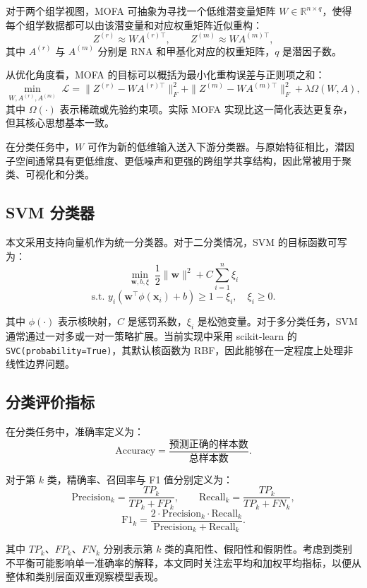对于两个组学视图，MOFA 可抽象为寻找一个低维潜变量矩阵 $W \in \mathbb{R}^{n \times q}$，使得每个组学数据都可以由该潜变量和对应权重矩阵近似重构：
\[
Z^{(r)} \approx W A^{(r)\top}, \qquad Z^{(m)} \approx W A^{(m)\top},
\]
其中 $A^{(r)}$ 与 $A^{(m)}$ 分别是 RNA 和甲基化对应的权重矩阵，$q$ 是潜因子数。

从优化角度看，MOFA 的目标可以概括为最小化重构误差与正则项之和：
\[
\min_{W, A^{(r)}, A^{(m)}} \; \mathcal{L} = \|Z^{(r)} - W A^{(r)\top}\|_F^2 + \|Z^{(m)} - W A^{(m)\top}\|_F^2 + \lambda \Omega(W, A),
\]
其中 $\Omega(\cdot)$ 表示稀疏或先验约束项。实际 MOFA 实现比这一简化表达更复杂，但其核心思想基本一致。

在分类任务中，$W$ 可作为新的低维输入送入下游分类器。与原始特征相比，潜因子空间通常具有更低维度、更低噪声和更强的跨组学共享结构，因此常被用于聚类、可视化和分类。

\subsection{SVM 分类器}

本文采用支持向量机作为统一分类器。对于二分类情况，SVM 的目标函数可写为：
\[
\min_{\mathbf{w}, b, \xi} \; \frac{1}{2}\|\mathbf{w}\|^2 + C \sum_{i=1}^{n} \xi_i
\]
\[
\text{s.t. } y_i (\mathbf{w}^\top \phi(\mathbf{x}_i) + b) \ge 1 - \xi_i, \quad \xi_i \ge 0.
\]

其中 $\phi(\cdot)$ 表示核映射，$C$ 是惩罚系数，$\xi_i$ 是松弛变量。对于多分类任务，SVM 通常通过一对多或一对一策略扩展。当前实现中采用 scikit-learn 的 \texttt{SVC(probability=True)}，其默认核函数为 RBF，因此能够在一定程度上处理非线性边界问题。

\subsection{分类评价指标}

在分类任务中，准确率定义为：
\[
\mathrm{Accuracy} = \frac{\text{预测正确的样本数}}{\text{总样本数}}.
\]

对于第 $k$ 类，精确率、召回率与 F1 值分别定义为：
\[
\mathrm{Precision}_k = \frac{TP_k}{TP_k + FP_k}, \qquad
\mathrm{Recall}_k = \frac{TP_k}{TP_k + FN_k},
\]
\[
\mathrm{F1}_k = \frac{2 \cdot \mathrm{Precision}_k \cdot \mathrm{Recall}_k}{\mathrm{Precision}_k + \mathrm{Recall}_k}.
\]

其中 $TP_k$、$FP_k$、$FN_k$ 分别表示第 $k$ 类的真阳性、假阳性和假阴性。考虑到类别不平衡可能影响单一准确率的解释，本文同时关注宏平均和加权平均指标，以便从整体和类别层面双重观察模型表现。

